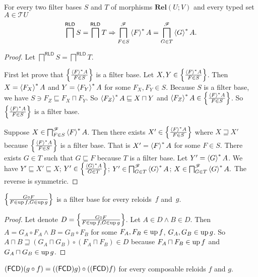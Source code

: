 \begin{lem}
\label{base-intrs-lem}For every two filter bases $S$ and $T$ of
morphisms $\mathbf{Rel}(U;V)$ and every typed set $A\in\mathscr{T}U$
\[
\bigsqcap^{\mathsf{RLD}}S=\bigsqcap^{\mathsf{RLD}}T\Rightarrow\bigsqcap_{F\in S}^{\mathscr{F}}\left\langle F\right\rangle ^{\ast}A=\bigsqcap_{G\in T}^{\mathscr{F}}\left\langle G\right\rangle ^{\ast}A.
\]
\end{lem}
\begin{proof}
Let $\bigsqcap^{\mathsf{RLD}}S=\bigsqcap^{\mathsf{RLD}}T$.

First let prove that $\left\{ \frac{\left\langle F\right\rangle ^{\ast}A}{F\in S}\right\}$ is a filter
base. Let $X,Y\in\left\{ \frac{\left\langle F\right\rangle ^{\ast}A}{F\in S}\right\}$. Then $X=\left\langle F_{X}\right\rangle ^{\ast}A$
and $Y=\left\langle F_{Y}\right\rangle ^{\ast}A$ for some $F_{X},F_{Y}\in S$. Because $S$
is a filter base, we have $S\ni F_{Z}\sqsubseteq F_{X}\sqcap F_{Y}$.
So $\left\langle F_{Z}\right\rangle ^{\ast}A\sqsubseteq X\sqcap Y$ and $\left\langle F_{Z}\right\rangle ^{\ast}A\in\left\{ \frac{\left\langle F\right\rangle ^{\ast}A}{F\in S}\right\}$.
So $\left\{ \frac{\left\langle F\right\rangle ^{\ast}A}{F\in S}\right\}$ is a filter base.

Suppose $X\in\bigsqcap_{F\in S}^{\mathscr{F}}\left\langle F\right\rangle ^{\ast}A$. Then there
exists $X'\in\left\{ \frac{\left\langle F\right\rangle ^{\ast}A}{F\in S}\right\}$ where $X\sqsupseteq X'$
because $\left\{ \frac{\left\langle F\right\rangle ^{\ast}A}{F\in S}\right\}$ is a filter base. That is
$X'=\left\langle F\right\rangle ^{\ast}A$ for some $F\in S$. There exists $G\in T$ such
that $G\sqsubseteq F$ because $T$ is a filter base. Let $Y'=\left\langle G\right\rangle ^{\ast}A$.
We have $Y'\sqsubseteq X'\sqsubseteq X$; $Y'\in\left\{ \frac{\left\langle G\right\rangle ^{\ast}A}{G\in T}\right\}$;
$Y'\in\bigsqcap_{G\in T}^{\mathscr{F}}\left\langle G\right\rangle ^{\ast}A$; $X\in\bigsqcap_{G\in T}^{\mathscr{F}}\left\langle G\right\rangle ^{\ast}A.$
The reverse is symmetric.\end{proof}
\begin{lem}
$\left\{ \frac{G\circ F}{F\in\operatorname{up} f,G\in\operatorname{up} g}\right\}$ is a filter base for every
reloids~$f$ and~$g$.\end{lem}
\begin{proof}
Let denote $D=\left\{ \frac{G\circ F}{F\in\operatorname{up} f,G\in\operatorname{up} g}\right\}$. Let $A\in D\land B\in D$.
Then $A=G_{A}\circ F_{A}\land B=G_{B}\circ F_{B}$ for some $F_{A},F_{B}\in\operatorname{up} f$,
$G_{A},G_{B}\in\operatorname{up} g$. So $A\sqcap B\sqsupseteq(G_{A}\sqcap G_{B})\circ(F_{A}\sqcap F_{B})\in D$
because $F_{A}\sqcap F_{B}\in\operatorname{up} f$ and $G_{A}\sqcap G_{B}\in\operatorname{up} g$.\end{proof}
\begin{thm}
$(\mathsf{FCD})(g\circ f)=((\mathsf{FCD}) g)\circ((\mathsf{FCD}) f)$ for every composable
reloids $f$ and $g$.\end{thm}
